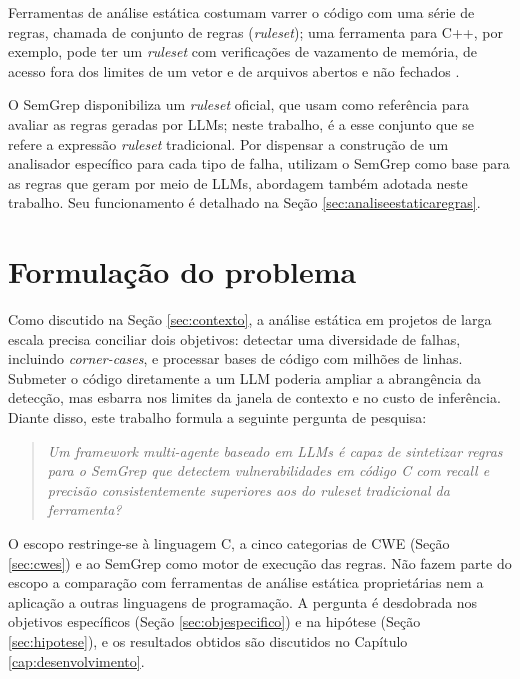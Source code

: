 \documentclass[
    12pt,                %
    openright,           %
    oneside,             %
    a4paper,             %
    english,             %
    brazil               %
]{abntex2}
\begin{document}
\par
Ferramentas de análise estática costumam varrer o código com uma série de regras, chamada de conjunto de regras (\textit{ruleset}); uma ferramenta para C++, por exemplo, pode ter um \textit{ruleset} com verificações de vazamento de memória, de acesso fora dos limites de um vetor e de arquivos abertos e não fechados \cite{hou2025generation}.
\par
O SemGrep disponibiliza um \textit{ruleset} oficial, que  usam como referência para avaliar as regras geradas por LLMs; neste trabalho, é a esse conjunto que se refere a expressão \textit{ruleset} tradicional.
Por dispensar a construção de um analisador específico para cada tipo de falha,  utilizam o SemGrep como base para as regras que geram por meio de LLMs, abordagem também adotada neste trabalho.
Seu funcionamento é detalhado na Seção \ref{sec:analiseestaticaregras}.

\section{Formulação do problema}
\label{sec:problema}
\par
Como discutido na Seção \ref{sec:contexto}, a análise estática em projetos de larga escala precisa conciliar dois objetivos: detectar uma diversidade de falhas, incluindo \textit{corner-cases}, e processar bases de código com milhões de linhas.
Submeter o código diretamente a um LLM poderia ampliar a abrangência da detecção, mas esbarra nos limites da janela de contexto e no custo de inferência.
Diante disso, este trabalho formula a seguinte pergunta de pesquisa:

\begin{quote}
\textit{Um \textit{framework} multi-agente baseado em LLMs é capaz de sintetizar regras para o SemGrep que detectem vulnerabilidades em código C com \textit{recall} e precisão consistentemente superiores aos do \textit{ruleset} tradicional da ferramenta?}
\end{quote}

\par
O escopo restringe-se à linguagem C, a cinco categorias de CWE (Seção \ref{sec:cwes}) e ao SemGrep como motor de execução das regras.
Não fazem parte do escopo a comparação com ferramentas de análise estática proprietárias nem a aplicação a outras linguagens de programação.
A pergunta é desdobrada nos objetivos específicos (Seção \ref{sec:objespecifico}) e na hipótese (Seção \ref{sec:hipotese}), e os resultados obtidos são discutidos no Capítulo \ref{cap:desenvolvimento}.
\end{document}
